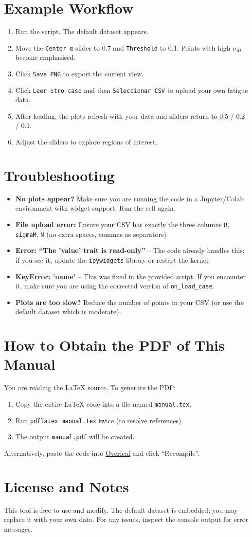\documentclass[12pt,a4paper]{article}
\begin{document}
\section{Example Workflow}
\begin{enumerate}
    \item Run the script. The default dataset appears.
    \item Move the \texttt{Center α} slider to 0.7 and \texttt{Threshold} to 0.1. Points with high $\sigma_M$ become emphasised.
    \item Click \texttt{Save PNG} to export the current view.
    \item Click \texttt{Leer otro caso} and then \texttt{Seleccionar CSV} to upload your own fatigue data.
    \item After loading, the plots refresh with your data and sliders return to 0.5 / 0.2 / 0.1.
    \item Adjust the sliders to explore regions of interest.
\end{enumerate}

\section{Troubleshooting}
\begin{itemize}
    \item \textbf{No plots appear?} Make sure you are running the code in a Jupyter/Colab environment with widget support. Run the cell again.
    \item \textbf{File upload error:} Ensure your CSV has exactly the three columns \texttt{R}, \texttt{sigmaM}, \texttt{N} (no extra spaces, commas as separators).
    \item \textbf{Error: ``The 'value' trait is read-only''} – The code already handles this; if you see it, update the \texttt{ipywidgets} library or restart the kernel.
    \item \textbf{KeyError: 'name'} – This was fixed in the provided script. If you encounter it, make sure you are using the corrected version of \texttt{on\_load\_case}.
    \item \textbf{Plots are too slow?} Reduce the number of points in your CSV (or use the default dataset which is moderate).
\end{itemize}

\section{How to Obtain the PDF of This Manual}
You are reading the LaTeX source. To generate the PDF:
\begin{enumerate}
    \item Copy the entire LaTeX code into a file named \texttt{manual.tex}.
    \item Run \texttt{pdflatex manual.tex} twice (to resolve references).
    \item The output \texttt{manual.pdf} will be created.
\end{enumerate}
Alternatively, paste the code into \href{https://www.overleaf.com}{Overleaf} and click ``Recompile''.

\section{License and Notes}
This tool is free to use and modify. The default dataset is embedded; you may replace it with your own data. For any issues, inspect the console output for error messages.
\end{document}
